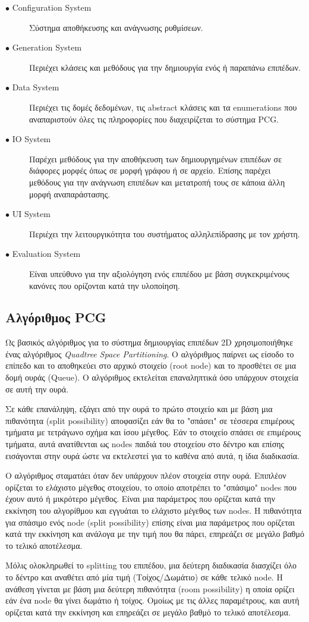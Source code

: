 \begin{description}
\item[$\bullet$ Configuration System] Σύστημα αποθήκευσης και ανάγνωσης ρυθμίσεων.
\item[$\bullet$ Generation System] Περιέχει κλάσεις και μεθόδους για την δημιουργία ενός ή παραπάνω επιπέδων.
\item[$\bullet$ Data System] Περιέχει τις δομές δεδομένων, τις abstract κλάσεις και τα enumerations που αναπαριστούν όλες τις πληροφορίες που διαχειρίζεται το σύστημα PCG.
\item[$\bullet$ IO System] Παρέχει μεθόδους για την αποθήκευση των δημιουργημένων επιπέδων σε διάφορες μορφές όπως σε μορφή γράφου ή σε αρχείο. Επίσης παρέχει μεθόδους για την ανάγνωση επιπέδων και μετατροπή τους σε κάποια άλλη μορφή αναπαράστασης.
\item[$\bullet$ UI System] Περιέχει την λειτουργικότητα του συστήματος αλληλεπίδρασης με τον χρήστη.
\item[$\bullet$ Evaluation System] Είναι υπεύθυνο για την αξιολόγηση ενός επιπέδου με βάση συγκεκριμένους κανόνες που ορίζονται κατά την υλοποίηση.
\end{description}

\subsection{Αλγόριθμος PCG}
Ως βασικός αλγόριθμος για το σύστημα δημιουργίας επιπέδων 2D χρησιμοποιήθηκε ένας αλγόριθμος \textit{Quadtree Space Partitioning}. O αλγόριθμος παίρνει ως είσοδο το επίπεδο και το αποθηκεύει στο αρχικό στοιχείο (root node) και το προσθέτει σε μια δομή ουράς (Queue). Ο αλγόριθμος εκτελείται επαναληπτικά όσο υπάρχουν στοιχεία σε αυτή την ουρά.
\par
Σε κάθε επανάληψη, εξάγει από την ουρά το πρώτο στοιχείο και με βάση μια πιθανότητα (split possibility) αποφασίζει εάν θα το "σπάσει" σε τέσσερα επιμέρους τμήματα με τετράγωνο σχήμα και ίσου μέγεθος. Εάν το στοιχείο σπάσει σε επιμέρους τμήματα, αυτά ανατίθενται ως nodes παιδιά του στοιχείου στο δέντρο και επίσης εισάγονται στην ουρά ώστε να εκτελεστεί για το καθένα από αυτά, η ίδια διαδικασία.
\par
Ο αλγόριθμος σταματάει όταν δεν υπάρχουν πλέον στοιχεία στην ουρά. Επιπλέον ορίζεται το ελάχιστο μέγεθος στοιχείου, το οποίο αποτρέπει το "σπάσιμο" nodes που έχουν αυτό ή μικρότερο μέγεθος. Είναι μια παράμετρος που ορίζεται κατά την εκκίνηση του αλγορίθμου και εγγυάται το ελάχιστο μέγεθος των nodes. Η πιθανότητα για σπάσιμο ενός node (split possibility) επίσης είναι μια παράμετρος που ορίζεται κατά την εκκίνηση και ανάλογα με την τιμή που θα πάρει, επηρεάζει σε μεγάλο βαθμό το τελικό αποτέλεσμα.
\par
Μόλις ολοκληρωθεί το splitting του επιπέδου, μια δεύτερη διαδικασία διασχίζει όλο το δέντρο και αναθέτει από μία τιμή (Τοίχος/Δωμάτιο) σε κάθε τελικό node. Η ανάθεση γίνεται με βάση μια δεύτερη πιθανότητα (room possibility) η οποία ορίζει εάν ένα node θα γίνει δωμάτιο ή τοίχος. Ομοίως με τις άλλες παραμέτρους, και αυτή ορίζεται κατά την εκκίνηση και επηρεάζει σε μεγάλο βαθμό το τελικό αποτέλεσμα.

